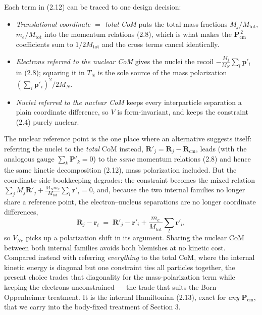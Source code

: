 Each term in (2.12) can be traced to one design decision:
\begin{itemize}
\item \emph{Translational coordinate $=$ total CoM} puts the total-mass fractions $M_j/M_{\mathrm{tot}}$, $m_e/M_{\mathrm{tot}}$ into the momentum relations (2.8), which is what makes the $\mathbf{P}_{\mathrm{cm}}^{\,2}$ coefficients sum to $1/2M_{\mathrm{tot}}$ and the cross terms cancel identically.
\item \emph{Electrons referred to the nuclear CoM} gives the nuclei the recoil $-\frac{M_j}{M_N}\sum_l\mathbf{p}'_l$ in (2.8); squaring it in $T_N$ is the sole source of the mass polarization $(\sum_i\mathbf{p}'_i)^2/2M_N$.
\item \emph{Nuclei referred to the nuclear CoM} keeps every interparticle separation a plain coordinate difference, so $V$ is form-invariant, and keeps the constraint (2.4) purely nuclear.
\end{itemize}
The nuclear reference point is the one place where an alternative suggests itself: referring the nuclei to the \emph{total} CoM instead, $\mathbf{R}'_j=\mathbf{R}_j-\mathbf{R}_{\mathrm{cm}}$, leads (with the analogous gauge $\sum_k\mathbf{P}'_k=0$) to the \emph{same} momentum relations (2.8) and hence the same kinetic decomposition (2.12), mass polarization included. But the coordinate-side bookkeeping degrades: the constraint becomes the mixed relation $\sum_j M_j\mathbf{R}'_j + \frac{M_N m_e}{M_{\mathrm{tot}}}\sum_i\mathbf{r}'_i = 0$, and, because the two internal families no longer share a reference point, the electron--nucleus separations are no longer coordinate differences,
\begin{equation}
\mathbf{R}_j-\mathbf{r}_i \;=\; \mathbf{R}'_j-\mathbf{r}'_i + \frac{m_e}{M_{\mathrm{tot}}}\sum_l\mathbf{r}'_l , \tag{2.14}
\end{equation}
so $V_{Ne}$ picks up a polarization shift in its argument. Sharing the nuclear CoM between both internal families avoids both blemishes at no kinetic cost. Compared instead with referring \emph{everything} to the total CoM, where the internal kinetic energy is diagonal but one constraint ties all particles together, the present choice trades that diagonality for the mass-polarization term while keeping the electrons unconstrained --- the trade that suits the Born--Oppenheimer treatment. It is the internal Hamiltonian (2.13), exact for \emph{any} $\mathbf{P}_{\mathrm{cm}}$, that we carry into the body-fixed treatment of Section 3.
